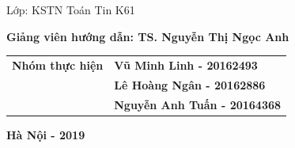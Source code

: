 \begin{titlepage}
\centerline{Lớp: KSTN Toán Tin K61}

\vspace*{1.25cm}
\centerline{\bf Giảng  viên hướng dẫn: TS. Nguyễn Thị Ngọc Anh}


\begin{center}
	\begin{tabular}{ll}
		\bf Nhóm thực hiện & \bf Vũ Minh Linh - 20162493 \\ 
		& \bf Lê Hoàng Ngân - 20162886\\ 
		& \bf Nguyễn Anh Tuấn - 20164368\\ 
	\end{tabular} 
\end{center}







\vfill
\centerline{\bf Hà Nội - 2019}
\end{titlepage}
